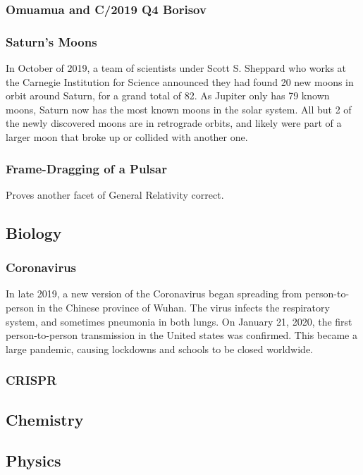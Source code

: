 			
			\subsubsection{Omuamua and C/2019 Q4 Borisov}
			
			
			\subsubsection{Saturn's Moons}
				In October of 2019, a team of scientists under Scott S. Sheppard who works at the Carnegie Institution for Science announced they had found 20 new moons in orbit around Saturn, for a grand total of 82. As Jupiter only has 79 known moons, Saturn now has the most known moons in the solar system.  All but 2 of the newly discovered moons are in retrograde orbits, and likely were part of a larger moon that broke up or collided with another one. 
			\subsubsection{Frame-Dragging of a Pulsar}
				Proves another facet of General Relativity correct.  
				
		\subsection{Biology}
			\subsubsection{Coronavirus}
			\label{Coronavirus} In late 2019, a new version of the Coronavirus began spreading from person-to-person in the Chinese province of Wuhan.  The virus infects the respiratory system, and sometimes pneumonia in both lungs.  On January 21, 2020, the first person-to-person transmission in the United states was confirmed.  This became a large pandemic, causing lockdowns and schools to be closed worldwide.  
			
			
			
			\subsubsection{CRISPR}
			
		
		\subsection{Chemistry}
		\subsection{Physics}
